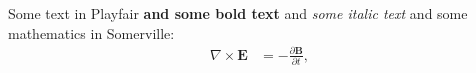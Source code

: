 \documentclass{article}
\begin{document}
Some text in Playfair \textbf{and some bold text} and \emph{some italic text} and some mathematics in Somerville:
\[
  \begin{aligned}
    \nabla\times\symbf{E} &= -\frac{\partial\symbf{B}}{\partial t}, \\
  \end{aligned}
\]
\end{document}
